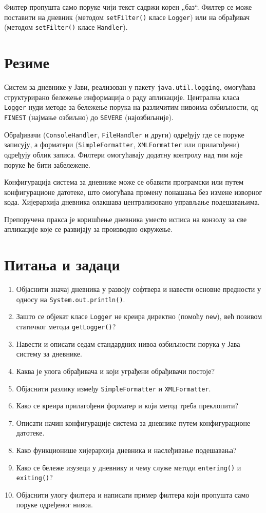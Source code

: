 Филтер пропушта само поруке чији текст садржи корен „баз“. Филтер се може поставити на дневник (методом \texttt{setFilter()} класе \texttt{Logger}) или на обрађивач (методом \texttt{setFilter()} класе \texttt{Handler}).


\section{Резиме}

Систем за дневнике у Јави, реализован у пакету \texttt{java.util.logging}, омогућава структурирано бележење информација о раду апликације. Централна класа \texttt{Logger} нуди методе за бележење порука на различитим нивоима озбиљности, од \texttt{FINEST} (најмање озбиљно) до \texttt{SEVERE} (најозбиљније).

Обрађивачи (\texttt{ConsoleHandler}, \texttt{FileHandler} и други) одређују где се поруке записују, а форматери (\texttt{SimpleFormatter}, \texttt{XMLFormatter} или прилагођени) одређују облик записа. Филтери омогућавају додатну контролу над тим које поруке ће бити забележене.

Конфигурација система за дневнике може се обавити програмски или путем конфигурационе датотеке, што омогућава промену понашања без измене изворног кода. Хијерархија дневника олакшава централизовано управљање подешавањима.

Препоручена пракса је коришћење дневника уместо исписа на конзолу за све апликације које се развијају за производно окружење.


\section{Питања и задаци}

\begin{enumerate}
\item Објаснити значај дневника у развоју софтвера и навести основне предности у односу на \texttt{System.out.println()}.
\item Зашто се објекат класе \texttt{Logger} не креира директно (помоћу \texttt{new}), већ позивом статичког метода \texttt{getLogger()}?
\item Навести и описати седам стандардних нивоа озбиљности порука у Јава систему за дневнике.
\item Каква је улога обрађивача и који уграђени обрађивачи постоје?
\item Објаснити разлику између \texttt{SimpleFormatter} и \texttt{XMLFormatter}.
\item Како се креира прилагођени форматер и који метод треба преклопити?
\item Описати начин конфигурације система за дневнике путем конфигурационе датотеке.
\item Како функционише хијерархија дневника и наслеђивање подешавања?
\item Како се бележе изузеци у дневнику и чему служе методи \texttt{entering()} и \texttt{exiting()}?
\item Објаснити улогу филтера и написати пример филтера који пропушта само поруке одређеног нивоа.
\end{enumerate}

